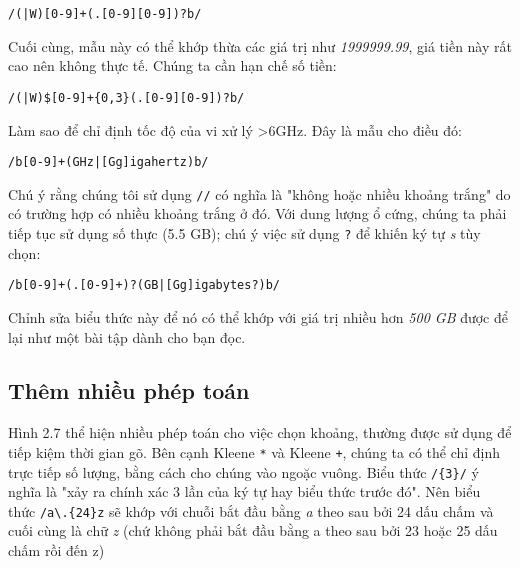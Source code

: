 \vspace{0.6em}

\noindent \texttt{/(|W)[0-9]+(.[0-9][0-9])?b/}

\vspace{0.6em}

Cuối cùng, mẫu này có thể khớp thừa các giá trị như \textit{1999999.99}, giá tiền này rất cao nên không thực tế. Chúng ta cần hạn chế số tiền:

\vspace{0.6em}

\noindent \texttt{/(|W)\$[0-9]+\{0,3\}(.[0-9][0-9])?b/}

\vspace{0.6em}

Làm sao để chỉ định tốc độ của vi xử lý >6GHz. Đây là mẫu cho điều đó:

\vspace{0.6em}

\noindent \texttt{/b[0-9]+\textvisiblespace*(GHz|[Gg]igahertz)b/}

\vspace{0.6em}

Chú ý rằng chúng tôi sử dụng \texttt{/\textvisiblespace*/} có nghĩa là "không hoặc nhiều khoảng trắng" do có trường hợp có nhiều khoảng trắng ở đó. Với dung lượng ổ cứng, chúng ta phải tiếp tục sử dụng số thực (5.5 GB); chú ý việc sử dụng \verb|?| để khiến ký tự \textit{s} tùy chọn:

\vspace{0.6em}

\noindent \texttt{/b[0-9]+(.[0-9]+)?\textvisiblespace *(GB|[Gg]igabytes?)b/}

\vspace{0.6em}

Chỉnh sửa biểu thức này để nó có thể khớp với giá trị nhiều hơn \textit{500 GB} được để lại như một bài tập dành cho bạn đọc.

\subsection{Thêm nhiều phép toán}

Hình 2.7 thể hiện nhiều phép toán cho việc chọn khoảng, thường được sử dụng để tiếp kiệm thời gian gõ. Bên cạnh Kleene \verb|*| và Kleene \verb|+|, chúng ta có thể chỉ định trực tiếp số lượng, bằng cách cho chúng vào ngoặc vuông. Biểu thức \verb|/{3}/| ý nghĩa là "xảy ra chính xác 3 lần của ký tự hay biểu thức trước đó". Nên biểu thức \verb|/a\.{24}z| sẽ khớp với chuỗi bắt đầu bằng \textit{a} theo sau bởi 24 dấu chấm và cuối cùng là chữ \textit{z} (chứ không phải bắt đầu bằng a theo sau bởi 23 hoặc 25 dấu chấm rồi đến z)

